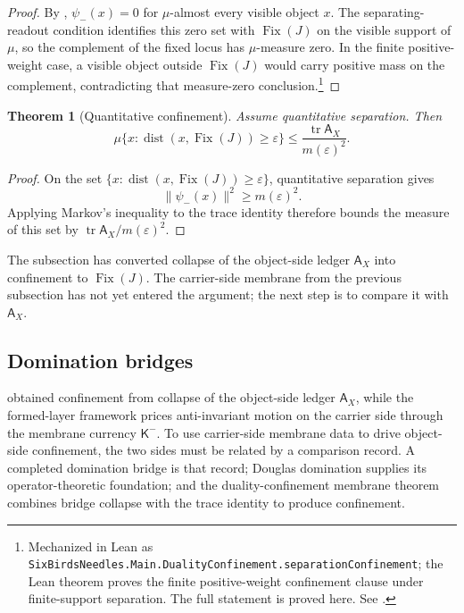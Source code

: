 \documentclass[11pt]{article}
\DeclareMathOperator{\tr}{tr}
\DeclareMathOperator{\dist}{dist}
\newcommand{\K}{\mathsf K}
\newcommand{\Fix}{\operatorname{Fix}}
\newtheorem{theorem}{Theorem}[section]
\theoremstyle{definition}
\begin{document}
\begin{proof}
By , \(\psi_-(x)=0\) for
\(\mu\)-almost every visible object \(x\).  The separating-readout
condition identifies this zero set with \(\Fix(J)\) on the visible
support of \(\mu\), so the complement of the fixed locus has
\(\mu\)-measure zero.  In the finite positive-weight case, a visible
object outside \(\Fix(J)\) would carry positive mass on the complement,
contradicting that measure-zero conclusion.\footnote{Mechanized in Lean as
\texttt{SixBirdsNeedles.Main.DualityConfinement.separationConfinement};
the Lean theorem proves the finite positive-weight confinement clause
under finite-support separation.  The full statement is proved here.
See .}
\end{proof}

\begin{theorem}[Quantitative confinement]\label{thm:main:quantitative-confinement}
Assume quantitative separation.  Then
\[
  \mu\{x:\dist(x,\Fix(J))\ge\varepsilon\}
  \le
  \frac{\tr\mathsf A_X}{m(\varepsilon)^2}.
\]
\end{theorem}

\begin{proof}
On the set
\(\{x:\dist(x,\Fix(J))\ge\varepsilon\}\), quantitative separation gives
\[
  \|\psi_-(x)\|^2\ge m(\varepsilon)^2.
\]
Applying Markov's inequality \citep{Billingsley1995ProbabilityMeasure}
to the trace identity therefore bounds the
measure of this set by
\(\tr\mathsf A_X/m(\varepsilon)^2\).
\end{proof}

The subsection has converted collapse of the object-side ledger
\(\mathsf A_X\) into confinement to \(\Fix(J)\).  The carrier-side
membrane from the previous subsection has not yet entered the argument;
the next step is to compare it with \(\mathsf A_X\).

\subsection{Domination bridges}

 obtained confinement from
collapse of the object-side ledger \(\mathsf A_X\), while the
formed-layer framework prices anti-invariant motion on the carrier side
through the membrane currency \(\K^-\).  To use carrier-side membrane
data to drive object-side confinement, the two sides must be related by
a comparison record.  A completed domination bridge is that record;
Douglas domination \citep{Douglas1966Majorization,FillmoreWilliams1971OperatorRanges}
supplies its operator-theoretic foundation; and the
duality-confinement membrane theorem combines bridge collapse with the
trace identity to produce confinement.
\end{document}
